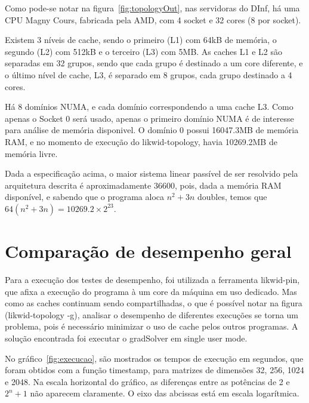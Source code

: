 \documentclass[12pt]{article}
\begin{document}
Como pode-se notar na figura~\ref{fig:topologyOut}, nas servidoras do DInf, há
uma CPU Magny Cours, fabricada pela AMD, com 4 socket e 32 cores (8 por socket).

Existem 3 níveis de cache, sendo o primeiro (L1) com 64kB de memória, o segundo
(L2) com 512kB e o terceiro (L3) com 5MB. As caches L1 e L2 são separadas em 32
grupos, sendo que cada grupo é destinado a um core diferente, e o último nível
de cache, L3, é separado em 8 grupos, cada grupo destinado a 4 cores.

Há 8 domínios NUMA, e cada domínio correspondendo a uma cache L3. Como apenas o
Socket 0 será usado, apenas o primeiro domínio NUMA é de interesse para análise
de memória disponivel. O domínio 0 possui 16047.3MB de memória RAM, e no momento
de execução do likwid-topology, havia 10269.2MB de memória livre.

Dada a especificação acima, o maior sistema linear passível de ser resolvido
pela arquitetura descrita é aproximadamente 36600, pois, dada a memória RAM
disponível, e sabendo que o programa aloca $n^2 + 3n$ doubles, temos que $64(n^2 +
3n) = 10269.2\times2^{23}$.

\section{Comparação de desempenho geral}\label{sec:desempenhoGeral}

Para a execução dos testes de desempenho, foi utilizada a ferramenta likwid-pin,
que afixa a execução do programa à um core da máquina em uso dedicado. Mas como
as caches continuam sendo compartilhadas, o que é possível notar na figura
(likwid-topology -g), analisar o desempenho de diferentes execuções se torna um
problema, pois é necessário minimizar o uso de cache pelos outros programas. A
solução encontrada foi executar o gradSolver em single user mode.

No gráfico~\ref{fig:execucao}, são mostrados os tempos de execução em segundos,
que foram obtidos com a função timestamp, para matrizes de dimensões 32, 256,
1024 e 2048. Na escala horizontal do gráfico, as diferenças entre as potências
de 2 e $2^n+1$ não aparecem claramente. O eixo das abcissas está em escala
logarítmica.
\end{document}

